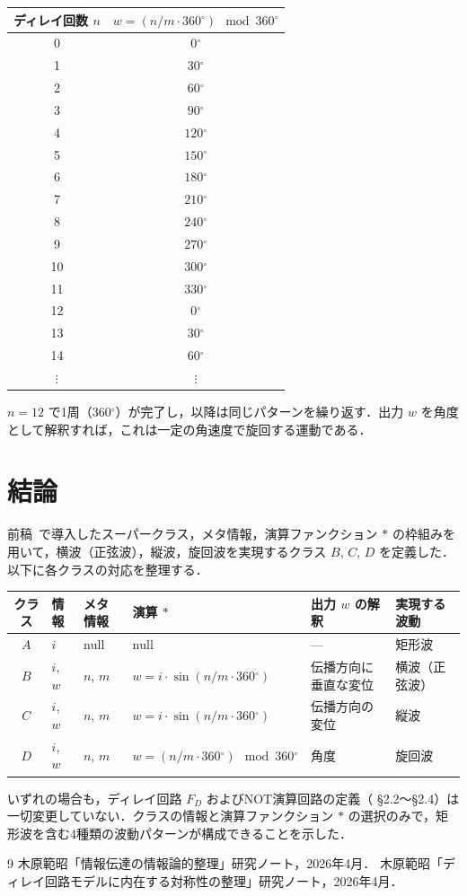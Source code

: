 \documentclass[12pt,a4paper]{ltjsarticle}
\begin{document}
\begin{table}[htbp]
  \centering
  \begin{tabular}{cc}
    \toprule
    ディレイ回数 $n$ & $w = (n/m \cdot 360{}^\circ) \mod 360{}^\circ$ \\
    \midrule
    0  & $0{}^\circ$ \\
    1  & $30{}^\circ$ \\
    2  & $60{}^\circ$ \\
    3  & $90{}^\circ$ \\
    4  & $120{}^\circ$ \\
    5  & $150{}^\circ$ \\
    6  & $180{}^\circ$ \\
    7  & $210{}^\circ$ \\
    8  & $240{}^\circ$ \\
    9  & $270{}^\circ$ \\
    10 & $300{}^\circ$ \\
    11 & $330{}^\circ$ \\
    12 & $0{}^\circ$ \\
    13 & $30{}^\circ$ \\
    14 & $60{}^\circ$ \\
    $\vdots$ & $\vdots$ \\
    \bottomrule
  \end{tabular}
\end{table}

$n = 12$ で1周（$360{}^\circ$）が完了し，以降は同じパターンを繰り返す．出力 $w$ を角度として解釈すれば，これは一定の角速度で旋回する運動である．

\section{結論}

前稿~\cite{ref2}で導入したスーパークラス，メタ情報，演算ファンクション $*$ の枠組みを用いて，横波（正弦波），縦波，旋回波を実現するクラス $B$, $C$, $D$ を定義した．以下に各クラスの対応を整理する．

\begin{table}[htbp]
  \centering
  \begin{tabular}{clllll}
    \toprule
    クラス & 情報 & メタ情報 & 演算 $*$ & 出力 $w$ の解釈 & 実現する波動 \\
    \midrule
    $A$ & $i$ & $\mathrm{null}$ & $\mathrm{null}$ & --- & 矩形波 \\
    $B$ & $i$, $w$ & $n$, $m$ & $w = i \cdot \sin(n/m \cdot 360{}^\circ)$ & 伝播方向に垂直な変位 & 横波（正弦波） \\
    $C$ & $i$, $w$ & $n$, $m$ & $w = i \cdot \sin(n/m \cdot 360{}^\circ)$ & 伝播方向の変位 & 縦波 \\
    $D$ & $i$, $w$ & $n$, $m$ & $w = (n/m \cdot 360{}^\circ) \!\!\mod 360{}^\circ$ & 角度 & 旋回波 \\
    \bottomrule
  \end{tabular}
\end{table}

いずれの場合も，ディレイ回路 $F_D$ およびNOT演算回路の定義（\cite{ref1} \S 2.2〜\S 2.4）は一切変更していない．クラスの情報と演算ファンクション $*$ の選択のみで，矩形波を含む4種類の波動パターンが構成できることを示した．

\begin{thebibliography}{9}
 木原範昭「情報伝達の情報論的整理」研究ノート，2026年4月．
 木原範昭「ディレイ回路モデルに内在する対称性の整理」研究ノート，2026年4月．
\end{thebibliography}
\end{document}
